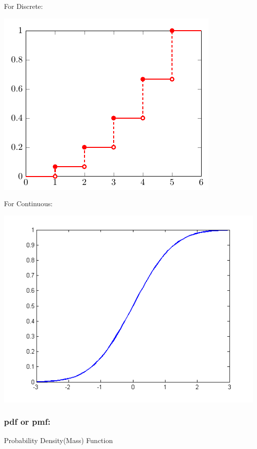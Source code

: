 \documentclass{article}
\begin{document}
{{{            \begin{enumerate}{
                \item For Discrete:
                    \begin{center}{
                        \includegraphics[scale=0.3]{dis-cdf.png}
                    }
                    \end{center} 
                \item For Continuous:
                    \begin{center}{
                        \includegraphics[scale=0.3]{con-cdf.png}
                    }
                    \end{center}  
            }
            \end{enumerate}  
        }
        \subsubsection{pdf or pmf: }{
            Probability Density(Mass) Function\\
            
}}}
\end{document}
